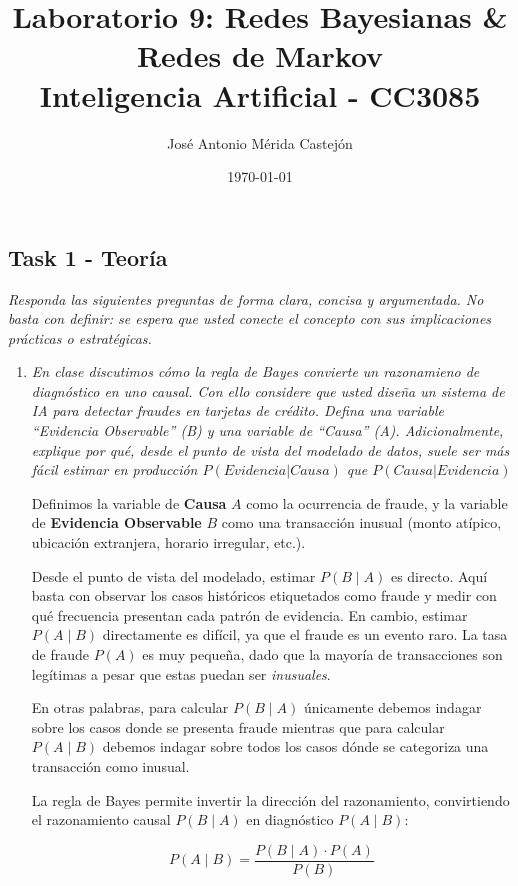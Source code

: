 \documentclass[11pt]{article}
\title{\textbf{Laboratorio 9: Redes Bayesianas \& Redes de Markov} \vspace{1em}\\
  Inteligencia Artificial - CC3085}
\author{José Antonio Mérida Castejón}
\date{\today}
\begin{document}
\maketitle

\subsection*{Task 1 - Teoría}
\textit{Responda las siguientes preguntas de forma clara, concisa y argumentada. No basta con
definir: se espera que usted conecte el concepto con sus implicaciones prácticas o estratégicas.}

\begin{enumerate}

  \item \textit{En clase discutimos cómo la regla de Bayes convierte un razonamieno de diagnóstico en uno causal. Con ello considere
    que usted diseña un sistema de IA para detectar fraudes en tarjetas de crédito. Defina una variable ``Evidencia Observable'' (B)
    y una variable de ``Causa'' (A). Adicionalmente, explique por qué, desde el punto de vista del modelado de datos, suele ser más
    fácil estimar en producción $P(Evidencia | Causa)$ que $P(Causa | Evidencia)$}

  Definimos la variable de \textbf{Causa} $A$ como la ocurrencia de fraude, y la variable de 
  \textbf{Evidencia Observable} $B$ como una transacción inusual (monto atípico, ubicación 
  extranjera, horario irregular, etc.).

  Desde el punto de vista del modelado, estimar $P(B \mid A)$ es directo. Aquí basta con observar 
  los casos históricos etiquetados como fraude y medir con qué frecuencia presentan cada patrón 
  de evidencia. En cambio, estimar $P(A \mid B)$ directamente es difícil, ya que el fraude es 
  un evento raro. La tasa de fraude $P(A)$ es muy pequeña, dado que la mayoría de transacciones son
  legítimas a pesar que estas puedan ser \textit{inusuales}.

  En otras palabras, para calcular $P(B \mid A)$ únicamente debemos indagar sobre los casos donde
  se presenta fraude mientras que para calcular $P(A \mid B)$ debemos indagar sobre todos los casos
  dónde se categoriza una transacción como inusual.

  La regla de Bayes permite invertir la dirección del razonamiento, convirtiendo el razonamiento 
  causal $P(B \mid A)$ en diagnóstico $P(A \mid B)$:

  $$P(A \mid B) = \frac{P(B \mid A) \cdot P(A)}{P(B)}$$


\end{enumerate}
\end{document}
